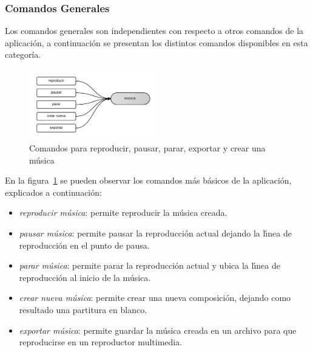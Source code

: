 \subsubsection{Comandos Generales}

Los comandos generales son independientes con respecto a otros comandos de la aplicaci\'on, a continuaci\'on se presentan los distintos
comandos disponibles en esta categor\'ia. 
\begin{figure}[H] 
\centering
\includegraphics[width=0.5\textwidth]{./graphics/cmd-musica.png}
\caption{Comandos para reproducir, pausar, parar, exportar y crear una m\'usica}
\label{figure:cmd-crear-musica}
\end{figure}

En la figura~\ref{figure:cmd-crear-musica} se pueden observar los comandos m\'as b\'asicos
de la aplicaci\'on, explicados a continuaci\'on:

\begin{itemize}
\item \emph{reproducir m\'usica}: permite reproducir la m\'usica creada.
\item \emph{pausar m\'usica}: permite pausar la reproducci\'on actual dejando la l{\'\i}nea de reproducci\'on en el
punto de pausa.
\item \emph{parar m\'usica}: permite parar la reproducci\'on actual y ubica la l{\'\i}nea de reproducci\'on al inicio de
la m\'usica.
\item \emph{crear nueva m\'usica}:  permite crear una nueva composici\'on, dejando como resultado una
partitura en blanco.
\item \emph{exportar m\'usica}: permite guardar la m\'usica creada en un archivo para que reproducirse en un
reproductor multimedia.
\end{itemize}

